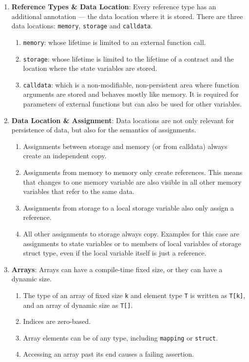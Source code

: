 \begin{enumerate}
\item\textbf{Reference Types \& Data Location}: Every reference type has an additional annotation — the data location where it is stored. There are three data locations: \verb|memory|, \verb|storage| and \verb|calldata|.
    \begin{enumerate}
    \item\verb|memory|: whose lifetime is limited to an external function call.
    \item\verb|storage|: whose lifetime is limited to the lifetime of a contract and the location where the state variables are stored.
    \item\verb|calldata|: which is a non-modifiable, non-persistent area where function arguments are stored and behaves mostly like memory. It is required for parameters of external functions but can also be used for other variables.
    \end{enumerate}

\item\textbf{Data Location \& Assignment}: Data locations are not only relevant for persistence of data, but also for the semantics of assignments.
    \begin{enumerate}
    \item Assignments between storage and memory (or from calldata) always create an independent copy.
    \item Assignments from memory to memory only create references. This means that changes to one memory variable are also visible in all other memory variables that refer to the same data.
    \item Assignments from storage to a local storage variable also only assign a reference.
    \item All other assignments to storage always copy. Examples for this case are assignments to state variables or to members of local variables of storage struct type, even if the local variable itself is just a reference.
    \end{enumerate}

\item\textbf{Arrays}: Arrays can have a compile-time fixed size, or they can have a dynamic size.
    \begin{enumerate}
    \item The type of an array of fixed size \verb|k| and element type \verb|T| is written as \verb|T[k]|, and an array of dynamic size as \verb|T[]|.
    \item Indices are zero-based.
    \item Array elements can be of any type, including \verb|mapping| or \verb|struct|.
    \item Accessing an array past its end causes a failing assertion.
    \end{enumerate}


\end{enumerate}
